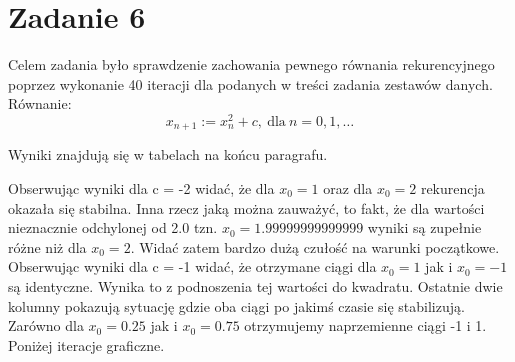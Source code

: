 \documentclass[]{article}
\begin{document}
	\section*{Zadanie 6}
	
	Celem zadania było sprawdzenie zachowania pewnego równania rekurencyjnego poprzez wykonanie 40 iteracji dla podanych w treści zadania zestawów danych. Równanie:
	$$x_{n+1} := x^2_n + c, \ \textrm{dla} \ n = 0,1,\dots$$
	
	Wyniki znajdują się w tabelach na końcu paragrafu.
	
	

	Obserwując wyniki dla c = -2 widać, że dla $x_0 = 1$ oraz dla $x_0 = 2$ rekurencja okazała się stabilna. Inna rzecz jaką można zauważyć, to fakt, że dla wartości nieznacznie odchylonej od 2.0 tzn. $x_0 = 1.99999999999999$ wyniki są zupełnie różne niż dla $x_0 = 2$. Widać zatem bardzo dużą czułość na warunki początkowe. Obserwując wyniki dla c = -1 widać, że otrzymane ciągi dla $x_0 = 1$ jak i $x_0 = -1$ są identyczne. Wynika to z podnoszenia tej wartości do kwadratu. Ostatnie dwie kolumny pokazują sytuację gdzie oba ciągi po jakimś czasie się stabilizują. Zarówno dla $x_0 = 0.25$ jak i $x_0 = 0.75$ otrzymujemy naprzemienne ciągi -1 i 1. Poniżej iteracje graficzne.
	
\end{document}
